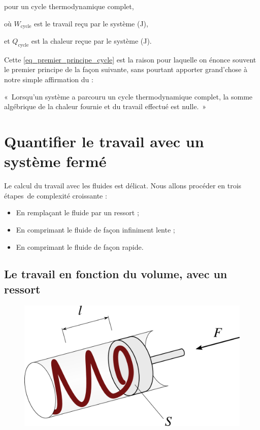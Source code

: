	\begin{equationterms}
		\item pour un cycle thermodynamique complet,
		\item où \tab $W_{\text{cycle}}$ \tab est le travail reçu par le système (\si{\joule}),
		\item et \tab $Q_{\text{cycle}}$ \tab est la chaleur reçue par le système (\si{\joule}).
	\end{equationterms}

	Cette \cref{eq_premier_principe_cycle} est la raison pour laquelle on énonce souvent le premier principe de la façon suivante, sans pourtant apporter grand’chose à notre simple affirmation du \coursunshort :

	«~Lorsqu’un système a parcouru un cycle thermodynamique complet, la somme algébrique de la chaleur fournie et du travail effectué est nulle.~»



\section{Quantifier le travail avec un système fermé}

	Le calcul du travail avec les fluides est délicat. Nous allons procéder en trois étapes~de complexité croissante :

	\begin{itemize}
		\item En remplaçant le fluide par un ressort ;
		\item En comprimant le fluide de façon infiniment lente ;
		\item En comprimant le fluide de façon rapide.
	\end{itemize}



	\subsection{Le travail en fonction du volume, avec un ressort}
	\label{ch_travail_pdv}

		\begin{figure}
			\begin{center}
				\includegraphics[width=12cm]{images/travail_cylindre_1.png}
			\end{center}
			\label{fig_piston_ressort}
		\end{figure}


